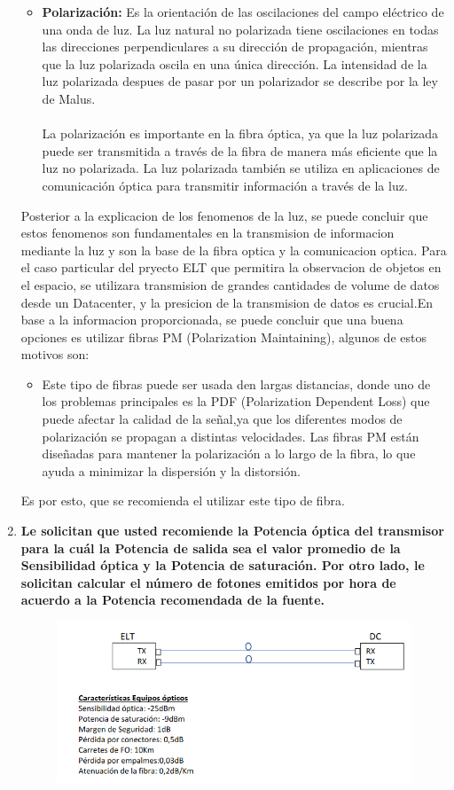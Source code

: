 \begin{enumerate}
\begin{itemize}
	\item \textbf{Polarización:} Es la orientación de las oscilaciones del campo eléctrico de una onda de luz. La luz natural no polarizada tiene oscilaciones en todas las direcciones perpendiculares a su dirección de propagación, mientras que la luz polarizada oscila en una única dirección. La intensidad de la luz polarizada despues de pasar por un polarizador se describe por la ley de Malus.\\\\
	La polarización es importante en la fibra óptica, ya que la luz polarizada puede ser transmitida a través de la fibra de manera más eficiente que la luz no polarizada. La luz polarizada también se utiliza en aplicaciones de comunicación óptica para transmitir información a través de la luz.
\end{itemize}
Posterior a la explicacion de los fenomenos de la luz, se puede concluir que estos fenomenos son fundamentales en la transmision de informacion mediante la luz y son la base de la fibra optica y la comunicacion optica. Para el caso particular del pryecto ELT que permitira la observacion de objetos en el espacio, se utilizara transmision de grandes cantidades de volume de datos desde un Datacenter, y la presicion de la transmision de datos es crucial.En base a la informacion proporcionada, se puede concluir que una buena opciones es utilizar fibras PM (Polarization Maintaining), algunos de estos motivos son:
\begin{itemize}
	\item Este tipo de fibras puede ser usada den largas distancias, donde uno de los problemas principales es la PDF (Polarization Dependent Loss) que puede afectar la calidad de la señal,ya que los diferentes modos de polarización se propagan a distintas velocidades. Las fibras PM están diseñadas para mantener la polarización a lo largo de la fibra, lo que ayuda a minimizar la dispersión y la distorsión.
\end{itemize}
Es por esto, que se recomienda el utilizar este tipo de fibra.
\item \textbf{Le solicitan que usted recomiende la Potencia óptica del transmisor para la
cuál la Potencia de salida sea el valor promedio de la Sensibilidad óptica y la
Potencia de saturación. Por otro lado, le solicitan calcular el número de fotones
emitidos por hora de acuerdo a la Potencia recomendada de la fuente.}
\begin{figure}
	\centering
	\includegraphics[width=0.8\linewidth]{img/P3_1.png}

\end{figure}
\end{enumerate}
